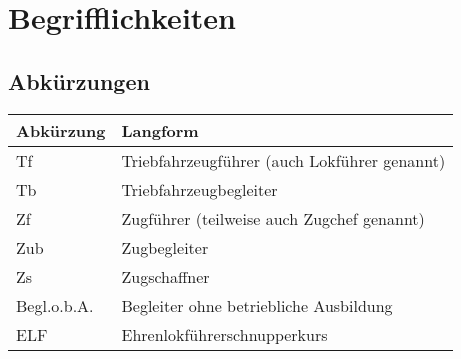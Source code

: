\chapter{Begrifflichkeiten}
\section{Abkürzungen}\label{abkuerzungen}
\begin{tabularx}{\textwidth}{l|X}
  Abkürzung & Langform \\
  \hline
  \hline
  Tf & Triebfahrzeugführer (auch Lokführer genannt)\\
  \hline
  Tb & Triebfahrzeugbegleiter \\
  \hline
  Zf & Zugführer (teilweise auch Zugchef genannt)\\
  \hline
  Zub	& Zugbegleiter \\
  \hline
  Zs & Zugschaffner \\
  \hline
  Begl.o.b.A. & Begleiter ohne betriebliche Ausbildung \\
  \hline
  ELF &	Ehrenlokführerschnupperkurs \\
\end{tabularx}


